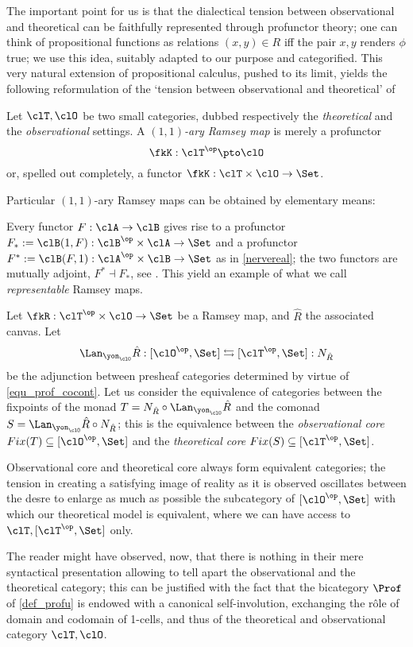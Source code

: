 The important point for us is that the dialectical tension between observational and theoretical can be faithfully represented through profunctor theory; one can think of propositional functions as relations $(x,y)\in R$ iff the pair $x,y$ renders $\phi$ true; we use this idea, suitably adapted to our purpose and categorified. This very natural extension of propositional calculus, pushed to its limit, yields the following reformulation of the `tension between observational and theoretical' of \cite{u,v,w}
\begin{definition}
  Let $\clT,\clO$ be two small categories, dubbed respectively the \emph{theoretical} and the \emph{observational} settings. A \emph{$(1,1)$-ary Ramsey map} is merely a profunctor 
  \[\fkK : \clT^\op \pto \clO\]
  or, spelled out completely, a functor $\fkK : \clT\times \clO \to \Set$.
\end{definition}
Particular $(1,1)$-ary Ramsey maps can be obtained by elementary means:
\begin{example}
 Every functor $F : \clA \to \clB$ gives rise to a profunctor $F_* := \clB(1,F) : \clB^\op\times \clA\to\Set$ and a profunctor $F^* := \clB(F,1) : \clA^\op\times\clB \to \Set$ as in \autoref{nervereal}; the two functors are mutually adjoint, $F^*\dashv F_*$, see \cite{}. This yield an example of what we call \emph{representable} Ramsey maps. 
\end{example}
\begin{definition}
  Let $\fkR : \clT^\op\times \clO \to\Set$ be a Ramsey map, and $\hat R$ the associated canvas. Let 
  \[ \Lan_{\yon_\clO}\hat R : [\clO^\op,\Set] \leftrightarrows [\clT^\op,\Set] : N_{\hat R} \]
  be the adjunction between presheaf categories determined by virtue of \autoref{equ_prof_cocont}. Let us consider the equivalence of categories between the fixpoints of the monad $T = N_{\hat R}\circ\Lan_{\yon_\clO}\hat R$ and the comonad $S=\Lan_{\yon_\clO}\hat R\circ N_{\hat R}$; this is the equivalence between the \emph{observational core} $Fix(T)\subseteq [\clO^\op,\Set]$ and the \emph{theoretical core} $Fix(S)\subseteq [\clT^\op,\Set]$.
\end{definition}
\begin{remark}
Observational core and theoretical core always form equivalent categories; the tension in creating a satisfying image of reality as it is observed oscillates between the desre to enlarge as much as possible the subcategory of $[\clO^\op,\Set]$ with which our theoretical model is equivalent, where we can have access to $\clT, [\clT^\op, \Set]$ only.
\end{remark}
The reader might have observed, now, that there is nothing in their mere syntactical presentation allowing to tell apart the observational and the theoretical category; this can be justified with the fact that the bicategory $\Prof$ of \autoref{def_profu} is endowed with a canonical self-involution, exchanging the r\^ole of domain and codomain of 1-cells, and thus of the theoretical and observational category $\clT,\clO$. 



